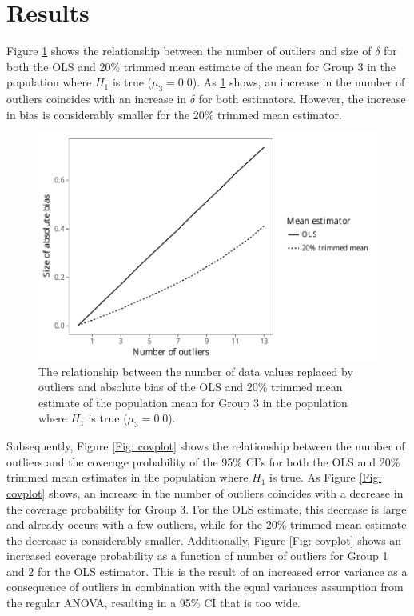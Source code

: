 \documentclass[11pt, a4paper]{article}
\begin{document}

\section{Results}
\label{section: Results}
Figure \ref{Fig: biasplot} shows the relationship between the number of outliers and size of $\delta$ for both the OLS and 20\% trimmed mean estimate of the mean for Group 3 in the population where $H_1$ is true ($\mu_3 = 0.0$).  
As \ref{Fig: biasplot} shows, an increase in the number of outliers coincides with an increase in $\delta$ for both estimators. 
However, the increase in bias is considerably smaller for the 20\% trimmed mean estimator. 

\begin{figure}[t]
\begin{center}

	\begin{minipage}{.5\textheight}
	\includegraphics[scale=0.75]{partI_biasplot_pop1.pdf}
	\caption{The relationship between the number of data values replaced by
	outliers and absolute bias of the OLS and 20\% trimmed mean estimate of the
	population mean for Group 3 in the population where $H_1$ is true ($\mu_3 = 
	0.0$).}
	\label{Fig: biasplot}
	\end{minipage}
	
\end{center}
\end{figure}

Subsequently, Figure \ref{Fig: covplot} shows the relationship between the number of outliers and the coverage probability of the 95\% CI's for both the OLS and 20\% trimmed mean estimates in the population where $H_1$ is true. 
As Figure \ref{Fig: covplot} shows, an increase in the number of outliers coincides with a decrease in the coverage probability for Group 3.
For the OLS estimate, this decrease is large and already occurs with a few outliers, while for the 20\% trimmed mean estimate the decrease is considerably smaller. 
Additionally, Figure \ref{Fig: covplot} shows an increased coverage probability as a function of number of outliers for Group 1 and 2 for the OLS estimator. This is the result of an increased error variance as a consequence of outliers in combination with the equal variances assumption from the regular ANOVA, resulting in a 95\% CI that is too wide. 
\end{document}
